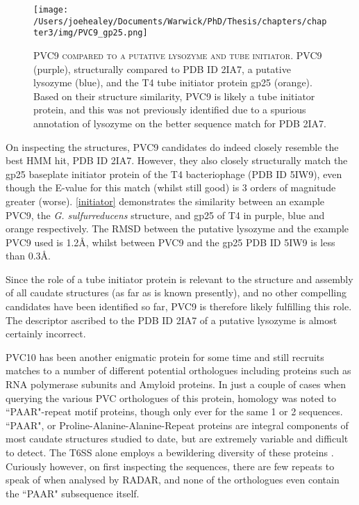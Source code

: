\begin{figure}[h]
\thispagestyle{IHA-fancy-style}
\centering
\texttt{[image: /Users/joehealey/Documents/Warwick/PhD/Thesis/chapters/chapter3/img/PVC9\_gp25.png]}
\captionsetup{singlelinecheck=off, justification=justified, font=footnotesize, aboveskip=10pt}
\caption[PVC9 as a tube initiator candidate]{\textsc{\normalsize PVC9 compared to a putative lysozyme and tube initiator.}\vspace{0.1cm} \newline PVC9 (purple), structurally compared to PDB ID 2IA7, a putative lysozyme (blue), and the T4 tube initiator protein gp25 (orange). Based on their structure similarity, PVC9 is likely a tube initiator protein, and this was not previously identified due to a spurious annotation of lysozyme on the better sequence match for PDB 2IA7.}
	\label{initiator}
\end{figure}


On inspecting the structures, PVC9 candidates do indeed closely resemble the best HMM hit, PDB ID 2IA7. However, they also closely structurally match the gp25 baseplate initiator protein of the T4 bacteriophage (PDB ID 5IW9), even though the E-value for this match (whilst still good) is 3 orders of magnitude greater (worse). \vref{initiator} demonstrates the similarity between an example PVC9, the \emph{G. sulfurreducens} structure, and gp25 of T4 in purple, blue and orange respectively. The RMSD between the putative lysozyme and the example PVC9 used is 1.2\AA, whilst between PVC9 and the gp25 PDB ID 5IW9 is less than 0.3\AA.


Since the role of a tube initiator protein is relevant to the structure and assembly of all caudate structures (as far as is known presently), and no other compelling candidates have been identified so far, PVC9 is therefore likely fulfilling this role. The descriptor ascribed to the PDB ID 2IA7 of a putative lysozyme is almost certainly incorrect.

PVC10 has been another enigmatic protein for some time and still recruits matches to a number of different potential orthologues including proteins such as RNA polymerase subunits and Amyloid proteins. In just a couple of cases when querying the various PVC orthologues of this protein, homology was noted to ``PAAR"-repeat motif proteins, though only ever for the same 1 or 2 sequences. ``PAAR", or Proline-Alanine-Alanine-Repeat proteins are integral components of most caudate structures studied to date, but are extremely variable and difficult to detect. The T6SS alone employs a bewildering diversity of these proteins \citep{Shneider2013}. Curiously however, on first inspecting the sequences, there are few repeats to speak of when analysed by RADAR, and none of the orthologues even contain the ``PAAR" subsequence itself.


